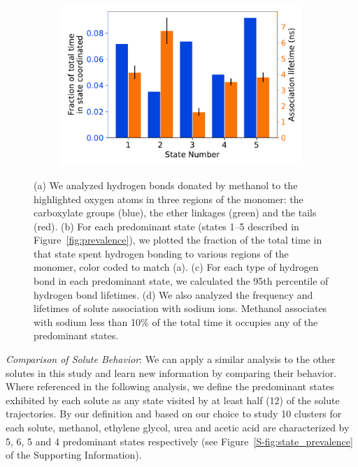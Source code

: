 \documentclass[journal=jpcbfk,manuscript=article]{achemso}
\begin{document}
\begin{figure}
\begin{subfigure}{0.475\textwidth}
  \caption{}\label{fig:hbond_lifetimes}
  \end{subfigure}
  \begin{subfigure}{0.475\textwidth}
  \includegraphics[width=\textwidth]{association_fraction_lifetimes.pdf}
  \caption{}\label{fig:association_fraction_lifetimes}
  \end{subfigure}
  \caption{(a) We analyzed hydrogen bonds donated by methanol to the highlighted oxygen
  atoms in three regions of the monomer: the carboxylate groups (blue), the ether linkages
  (green) and the tails (red). (b) For each predominant state (states 1--5 described in 
  Figure~\ref{fig:prevalence}), we plotted the fraction of the total time in that state 
  spent hydrogen bonding to various regions of the monomer, color coded to match (a).
  (c) For each type of hydrogen bond in each predominant state, we calculated the 95th percentile
  of hydrogen bond lifetimes. (d) We also analyzed the frequency and lifetimes of solute 
  association with sodium ions. Methanol associates with sodium less than 10\% of the total 
  time it occupies any of the predominant states.
  }
  \label{fig:hydrogen_bonding}
  \end{figure}
  
  \textit{Comparison of Solute Behavior}: We can apply a similar analysis to the other 
  solutes in this study and learn new information by comparing their behavior. 
  Where referenced in the following analysis, we define the predominant states 
  exhibited by each solute as any state visited by at least half (12) of the 
  solute trajectories. By our definition and based on our choice to study 10 
  clusters for each solute, methanol, ethylene glycol, urea and acetic acid are
  characterized by 5, 6, 5 and 4 predominant states respectively 
  (see Figure~\ref{S-fig:state_prevalence} of the Supporting Information).
 
\end{document}
